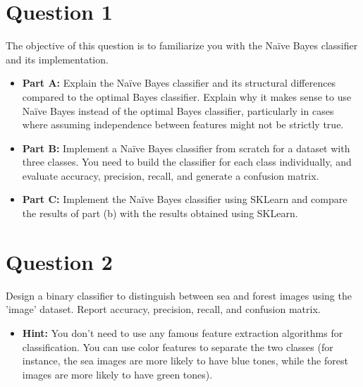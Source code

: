 \documentclass[12pt]{article}
\newcommand{\proof}[1]{
{\noindent {\it Proof.} {#1} \rule{2mm}{2mm} \vskip \belowdisplayskip}
}
\newtheorem{theorem}[lemma]{Theorem}
\begin{document}
\setlength{\fboxrule}{.5mm}\setlength{\fboxsep}{1.2mm}
\newlength{\boxlength}\setlength{\boxlength}{\textwidth}
\addtolength{\boxlength}{-4mm}
\begin{center}\end{center}
\vspace{5mm}

\section*{Question 1}
The objective of this question is to familiarize you with the Naïve Bayes classifier and its implementation.
\begin{itemize}
    \item \textbf{Part A:} Explain the Naïve Bayes classifier and its structural differences compared to 
                           the optimal Bayes classifier. Explain why it makes sense to use Naïve Bayes instead 
                           of the optimal Bayes classifier, particularly in cases where assuming independence 
                           between features might not be strictly true.
    
    \item \textbf{Part B:} Implement a Naïve Bayes classifier from scratch for a dataset with three classes. 
                           You need to build the classifier for each class individually, and evaluate accuracy, 
                           precision, recall, and generate a confusion matrix.

    \item \textbf{Part C:} Implement the Naïve Bayes classifier using SKLearn and compare the results of part (b) 
                           with the results obtained using SKLearn.
\end{itemize}

\section*{Question 2}
Design a binary classifier to distinguish between sea and forest images using the 'image' 
dataset. Report accuracy, precision, recall, and confusion matrix.

\begin{itemize}
    \item \textbf{Hint:} You don't need to use any famous feature extraction algorithms for classification. 
                         You can use color features to separate the two classes (for instance, the sea images are 
                         more likely to have blue tones, while the forest images are more likely to have green tones).
    
\end{itemize}


\end{document}
